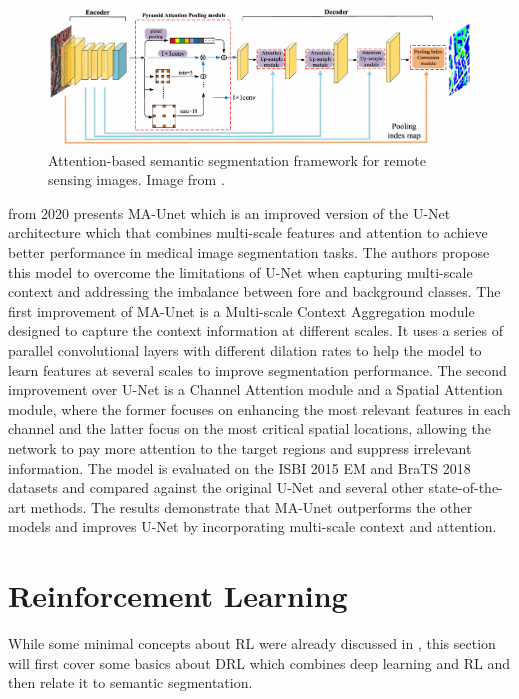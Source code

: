 \begin{figure}[H]%
    \centering
    \includegraphics[width=\imgWidthXL]{images/attention_remote_sensing.png}
    \caption[Remote sensing framework]{Attention-based semantic segmentation framework for remote sensing images. Image from \cite{9513251}.}
    \label{attention_remote_sensing}
\end{figure}

 \cite{https://doi.org/10.48550/arxiv.2012.10952} from 2020 presents MA-Unet which is an improved version of the U-Net architecture which that combines multi-scale features and attention to achieve better performance in medical image segmentation tasks. The authors propose this model to overcome the limitations of U-Net when capturing multi-scale context and addressing the imbalance between fore and background classes. The first improvement of MA-Unet is a Multi-scale Context Aggregation module designed to capture the context information at different scales. It uses a series of parallel convolutional layers with different dilation rates to help the model to learn features at several scales to improve segmentation performance. The second improvement over U-Net is a Channel Attention module and a Spatial Attention module, where the former focuses on enhancing the most relevant features in each channel and the latter focus on the most critical spatial locations, allowing the network to pay more attention to the target regions and suppress irrelevant information. The model is evaluated on the ISBI 2015 EM \cite{DBLP:conf/isbi/2015} and BraTS 2018 \cite{DBLP:journals/corr/abs-1811-02629} datasets and compared against the original U-Net and several other state-of-the-art methods. The results demonstrate that MA-Unet outperforms the other models and improves U-Net by incorporating multi-scale context and attention.

\section{Reinforcement Learning}
While some minimal concepts about \ac{RL} were already discussed in , this section will first cover some basics about \ac{DRL} which combines deep learning and \ac{RL} and then relate it to semantic segmentation. 


